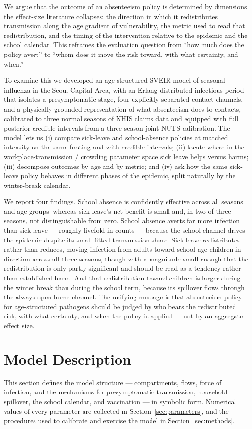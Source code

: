 \documentclass[12pt]{article}
\theoremstyle{plain}
\theoremstyle{remark}
\theoremstyle{definition}
\begin{document}
We argue that the outcome of an absenteeism policy is determined by dimensions the effect-size literature collapses: the direction in which it redistributes transmission along the age gradient of vulnerability, the metric used to read that redistribution, and the timing of the intervention relative to the epidemic and the school calendar. This reframes the evaluation question from ``how much does the policy avert'' to ``whom does it move the risk toward, with what certainty, and when.''

To examine this we developed an age-structured SVEIR model of seasonal influenza in the Seoul Capital Area, with an Erlang-distributed infectious period that isolates a presymptomatic stage, four explicitly separated contact channels, and a physically grounded representation of what absenteeism does to contacts, calibrated to three normal seasons of NHIS claims data and equipped with full posterior credible intervals from a three-season joint NUTS calibration. The model lets us (i) compare sick-leave and school-absence policies at matched intensity on the same footing and with credible intervals; (ii) locate where in the workplace-transmission / crowding parameter space sick leave helps versus harms; (iii) decompose outcomes by age and by metric; and (iv) ask how the same sick-leave policy behaves in different phases of the epidemic, split naturally by the winter-break calendar.

We report four findings. School absence is confidently effective across all seasons and age groups, whereas sick leave's net benefit is small and, in two of three seasons, not distinguishable from zero. School absence averts far more infection than sick leave --- roughly fivefold in counts --- because the school channel drives the epidemic despite its small fitted transmission share. Sick leave redistributes rather than reduces, moving infection from adults toward school-age children in direction across all three seasons, though with a magnitude small enough that the redistribution is only partly significant and should be read as a tendency rather than established harm. And that redistribution toward children is larger during the winter break than during the school term, because its spillover flows through the always-open home channel. The unifying message is that absenteeism policy for age-structured pathogens should be judged by who bears the redistributed risk, with what certainty, and when the policy is applied --- not by an aggregate effect size.

\section{Model Description}
\label{sec:model}
This section defines the model structure --- compartments, flows, force of infection, and the mechanisms for presymptomatic transmission, household spillover, the school calendar, and vaccination --- in symbolic form. Numerical values of every parameter are collected in Section~\ref{sec:parameters}, and the procedures used to calibrate and exercise the model in Section~\ref{sec:methods}.
\end{document}
